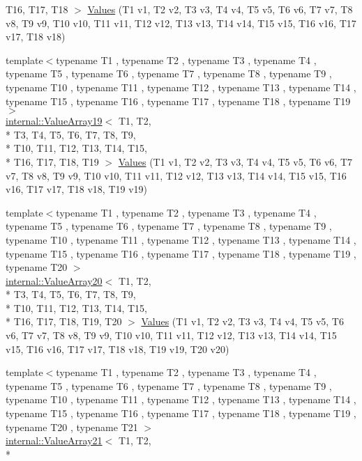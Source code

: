 \begin{DoxyCompactItemize}
T16, T17, T18 $>$ \hyperlink{namespacetesting_ab442a00c98b4bfb3bfa81f5e06bf53f9}{Values} (T1 v1, T2 v2, T3 v3, T4 v4, T5 v5, T6 v6, T7 v7, T8 v8, T9 v9, T10 v10, T11 v11, T12 v12, T13 v13, T14 v14, T15 v15, T16 v16, T17 v17, T18 v18)
\item 
{\footnotesize template$<$typename T1 , typename T2 , typename T3 , typename T4 , typename T5 , typename T6 , typename T7 , typename T8 , typename T9 , typename T10 , typename T11 , typename T12 , typename T13 , typename T14 , typename T15 , typename T16 , typename T17 , typename T18 , typename T19 $>$ }\\\hyperlink{classtesting_1_1internal_1_1_value_array19}{internal\-::\-Value\-Array19}$<$ T1, T2, \\*
T3, T4, T5, T6, T7, T8, T9, \\*
T10, T11, T12, T13, T14, T15, \\*
T16, T17, T18, T19 $>$ \hyperlink{namespacetesting_a673757dbfc048bbb48e459485b30b2bf}{Values} (T1 v1, T2 v2, T3 v3, T4 v4, T5 v5, T6 v6, T7 v7, T8 v8, T9 v9, T10 v10, T11 v11, T12 v12, T13 v13, T14 v14, T15 v15, T16 v16, T17 v17, T18 v18, T19 v19)
\item 
{\footnotesize template$<$typename T1 , typename T2 , typename T3 , typename T4 , typename T5 , typename T6 , typename T7 , typename T8 , typename T9 , typename T10 , typename T11 , typename T12 , typename T13 , typename T14 , typename T15 , typename T16 , typename T17 , typename T18 , typename T19 , typename T20 $>$ }\\\hyperlink{classtesting_1_1internal_1_1_value_array20}{internal\-::\-Value\-Array20}$<$ T1, T2, \\*
T3, T4, T5, T6, T7, T8, T9, \\*
T10, T11, T12, T13, T14, T15, \\*
T16, T17, T18, T19, T20 $>$ \hyperlink{namespacetesting_aedd2f90dfb3c42dce713ba0b89cde96c}{Values} (T1 v1, T2 v2, T3 v3, T4 v4, T5 v5, T6 v6, T7 v7, T8 v8, T9 v9, T10 v10, T11 v11, T12 v12, T13 v13, T14 v14, T15 v15, T16 v16, T17 v17, T18 v18, T19 v19, T20 v20)
\item 
{\footnotesize template$<$typename T1 , typename T2 , typename T3 , typename T4 , typename T5 , typename T6 , typename T7 , typename T8 , typename T9 , typename T10 , typename T11 , typename T12 , typename T13 , typename T14 , typename T15 , typename T16 , typename T17 , typename T18 , typename T19 , typename T20 , typename T21 $>$ }\\\hyperlink{classtesting_1_1internal_1_1_value_array21}{internal\-::\-Value\-Array21}$<$ T1, T2, \\*

\end{DoxyCompactItemize}
